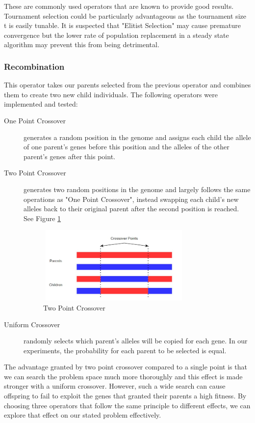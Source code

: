 \documentclass[sigconf]{acmart}
\begin{document}
These are commonly used operators that are known to provide good results. Tournament selection could be particularly advantageous as the tournament size t is easily tunable. It is suspected that "Elitist Selection" may cause premature convergence but the lower rate of population replacement in a steady state algorithm may prevent this from being detrimental.

\subsubsection{Recombination}
This operator takes our parents selected from the previous operator and combines them to create two new child individuals. The following operators were implemented and tested:
\begin{description}
\item[One Point Crossover] generates a random position in the genome and assigns each child the allele of one parent's genes before this position and the alleles of the other parent's genes after this point. \cite{Belfiore1998}
\item[Two Point Crossover] generates two random positions in the genome and largely follows the same operations as "One Point Crossover", instead swapping each child's new alleles back to their original parent after the second position is reached\cite{Belfiore1998}. See Figure \ref{fig:2Point}
\begin{figure}[!htb]
\includegraphics[height=1.5in,width=3in]{2Point}
\caption{Two Point Crossover}
\label{fig:2Point}
\end{figure}
\item[Uniform Crossover] randomly selects which parent's alleles will be copied for each gene. In our experiments, the probability for each parent to be selected is equal. \cite{Belfiore1998}
\end{description}

The advantage granted by two point crossover compared to a single point is that we can search the problem space much more thoroughly and this effect is made stronger with a uniform crossover. However, such a wide search can cause offspring to fail to exploit the genes that granted their parents a high fitness. By choosing three operators that follow the same principle to different effects, we can explore that effect on our stated problem effectively.
\end{document}
